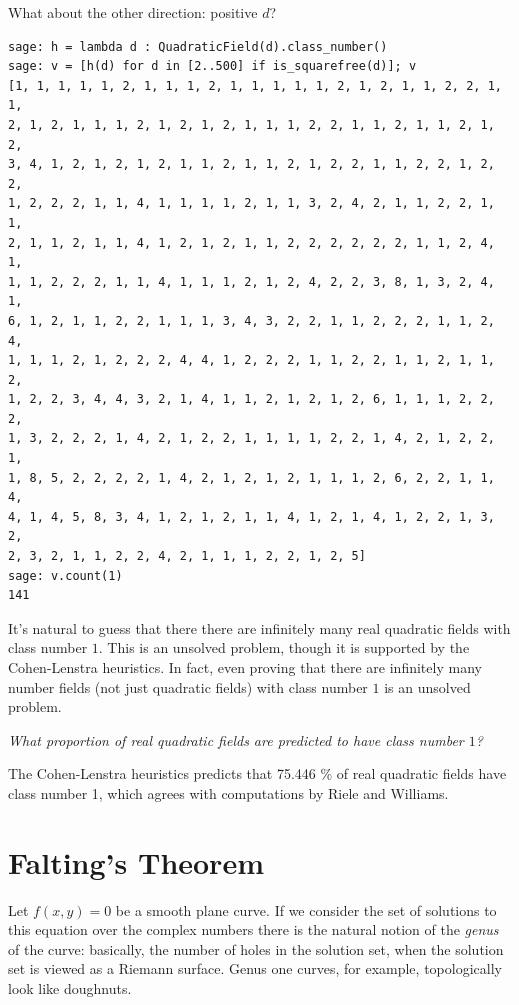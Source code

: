 \documentclass{book}
\theoremstyle{plain}
\theoremstyle{definition}
\numberwithin{equation}{section}
\numberwithin{figure}{section}
\numberwithin{table}{section}
\newcommand{\hw}[2]{\par\vspace{1em}{\bf HW (#1):} {\em #2}\par\vspace{1em}}
\begin{document}
What about the other direction: positive $d$?
\begin{lstlisting}
sage: h = lambda d : QuadraticField(d).class_number()
sage: v = [h(d) for d in [2..500] if is_squarefree(d)]; v
[1, 1, 1, 1, 1, 2, 1, 1, 1, 2, 1, 1, 1, 1, 1, 2, 1, 2, 1, 1, 2, 2, 1, 1,
2, 1, 2, 1, 1, 1, 2, 1, 2, 1, 2, 1, 1, 1, 2, 2, 1, 1, 2, 1, 1, 2, 1, 2,
3, 4, 1, 2, 1, 2, 1, 2, 1, 1, 2, 1, 1, 2, 1, 2, 2, 1, 1, 2, 2, 1, 2, 2,
1, 2, 2, 2, 1, 1, 4, 1, 1, 1, 1, 2, 1, 1, 3, 2, 4, 2, 1, 1, 2, 2, 1, 1,
2, 1, 1, 2, 1, 1, 4, 1, 2, 1, 2, 1, 1, 2, 2, 2, 2, 2, 2, 1, 1, 2, 4, 1,
1, 1, 2, 2, 2, 1, 1, 4, 1, 1, 1, 2, 1, 2, 4, 2, 2, 3, 8, 1, 3, 2, 4, 1,
6, 1, 2, 1, 1, 2, 2, 1, 1, 1, 3, 4, 3, 2, 2, 1, 1, 2, 2, 2, 1, 1, 2, 4,
1, 1, 1, 2, 1, 2, 2, 2, 4, 4, 1, 2, 2, 2, 1, 1, 2, 2, 1, 1, 2, 1, 1, 2,
1, 2, 2, 3, 4, 4, 3, 2, 1, 4, 1, 1, 2, 1, 2, 1, 2, 6, 1, 1, 1, 2, 2, 2,
1, 3, 2, 2, 2, 1, 4, 2, 1, 2, 2, 1, 1, 1, 1, 2, 2, 1, 4, 2, 1, 2, 2, 1,
1, 8, 5, 2, 2, 2, 2, 1, 4, 2, 1, 2, 1, 2, 1, 1, 1, 2, 6, 2, 2, 1, 1, 4,
4, 1, 4, 5, 8, 3, 4, 1, 2, 1, 2, 1, 1, 4, 1, 2, 1, 4, 1, 2, 2, 1, 3, 2,
2, 3, 2, 1, 1, 2, 2, 4, 2, 1, 1, 1, 2, 2, 1, 2, 5]
sage: v.count(1)
141
\end{lstlisting}
It's natural to guess that there there are infinitely many
real quadratic fields with class number $1$.
This is an unsolved problem, though it is supported
by the Cohen-Lenstra heuristics.   In fact, even proving
that there are infinitely many number fields (not just quadratic
fields) with class number $1$ is an unsolved problem.

\hw{Volunteer}{What proportion of real quadratic fields are
predicted to have class number $1$?}


The Cohen-Lenstra heuristics predicts that 75.446 \% of 
real quadratic fields have class number 1, which agrees
with computations by Riele and Williams.


\section{Falting's Theorem}\label{sec:faltings}
Let $f(x,y)=0$ be a smooth plane curve. If we consider the set of solutions to this equation over the complex numbers there is the natural notion of the {\it genus} of the curve: basically, the number of holes in the solution set, when the solution set is viewed as a Riemann surface. Genus one curves, for example, topologically look like doughnuts. \\
\end{document}
